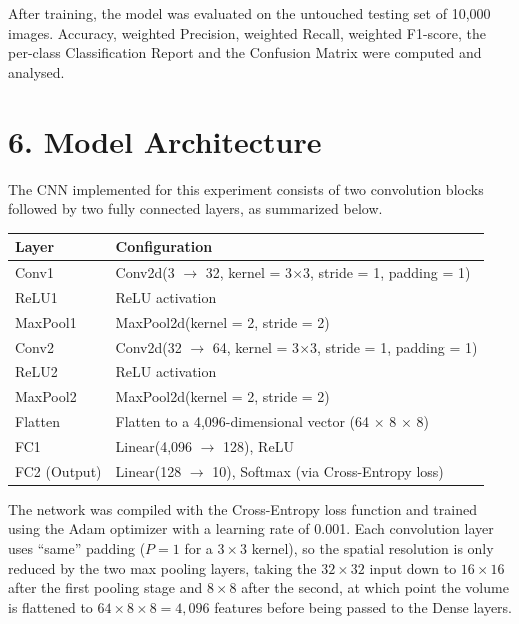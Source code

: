 \documentclass[11pt,a4paper]{article}
\begin{document}
After training, the model was evaluated on the untouched testing set of 10{,}000 images. Accuracy, weighted Precision, weighted Recall, weighted F1-score, the per-class Classification Report and the Confusion Matrix were computed and analysed.

\section*{6. Model Architecture}

The CNN implemented for this experiment consists of two convolution blocks followed by two fully connected layers, as summarized below.

\begin{center}
\begin{tabular}{|p{5.5cm}|p{9.5cm}|}
\hline
\textbf{Layer} & \textbf{Configuration}\\
\hline
Conv1 & Conv2d(3 $\rightarrow$ 32, kernel = 3$\times$3, stride = 1, padding = 1)\\
\hline
ReLU1 & ReLU activation\\
\hline
MaxPool1 & MaxPool2d(kernel = 2, stride = 2)\\
\hline
Conv2 & Conv2d(32 $\rightarrow$ 64, kernel = 3$\times$3, stride = 1, padding = 1)\\
\hline
ReLU2 & ReLU activation\\
\hline
MaxPool2 & MaxPool2d(kernel = 2, stride = 2)\\
\hline
Flatten & Flatten to a 4{,}096-dimensional vector (64 $\times$ 8 $\times$ 8)\\
\hline
FC1 & Linear(4{,}096 $\rightarrow$ 128), ReLU\\
\hline
FC2 (Output) & Linear(128 $\rightarrow$ 10), Softmax (via Cross-Entropy loss)\\
\hline
\end{tabular}
\end{center}

\vspace{0.15cm}

The network was compiled with the Cross-Entropy loss function and trained using the Adam optimizer with a learning rate of 0.001. Each convolution layer uses ``same'' padding ($P=1$ for a $3\times3$ kernel), so the spatial resolution is only reduced by the two max pooling layers, taking the $32\times32$ input down to $16\times16$ after the first pooling stage and $8\times8$ after the second, at which point the volume is flattened to $64\times8\times8=4{,}096$ features before being passed to the Dense layers.
\end{document}

